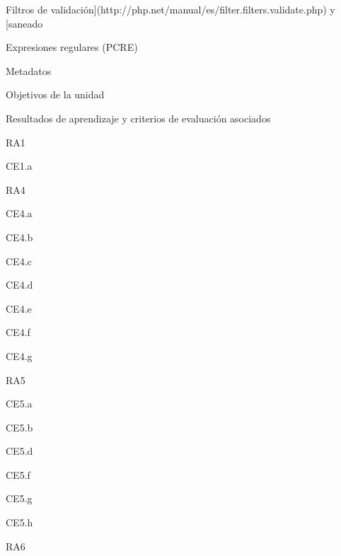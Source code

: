 \begin{longenum}
\begin{longenum}
\begin{longenum}
\begin{longenum}
\begin{longenum}
                    \item Filtros de validación](http://php.net/manual/es/filter.filters.validate.php) y [saneado
                \end{longenum}
                \item Expresiones regulares (PCRE)
            \end{longenum}
        \end{longenum}
        \item Metadatos
        \begin{longenum}
            \item Objetivos de la unidad
            \item Resultados de aprendizaje y criterios de evaluación asociados
            \begin{longenum}
                \item RA1
                \begin{longenum}
                    \item CE1.a
                \end{longenum}
                \item RA4
                \begin{longenum}
                    \item CE4.a
                    \item CE4.b
                    \item CE4.c
                    \item CE4.d
                    \item CE4.e
                    \item CE4.f
                    \item CE4.g
                \end{longenum}
                \item RA5
                \begin{longenum}
                    \item CE5.a
                    \item CE5.b
                    \item CE5.d
                    \item CE5.f
                    \item CE5.g
                    \item CE5.h
                \end{longenum}
                \item RA6
                \begin{longenum}

\end{longenum}
\end{longenum}
\end{longenum}
\end{longenum}
\end{longenum}
